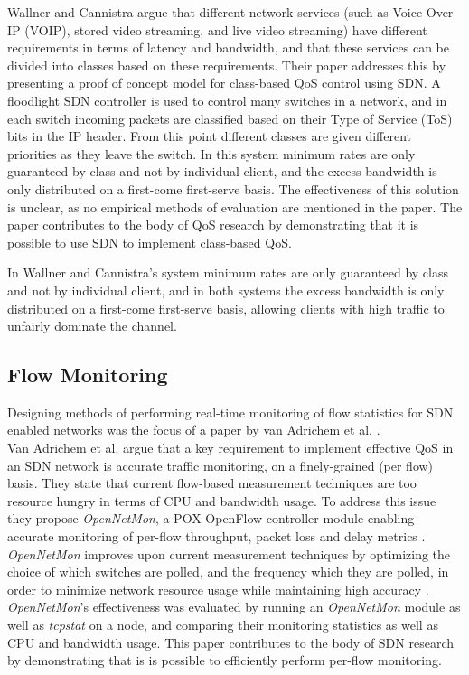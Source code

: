 \documentclass[accepted,single]{gipaper}
\begin{document}
Wallner and Cannistra \cite{Wallner:2013} argue that different network services (such as Voice Over IP (VOIP), stored video streaming, and live video streaming) have different requirements in terms of latency and bandwidth, and that these services can be divided into classes based on these requirements. Their paper addresses this by presenting a proof of concept model for class-based QoS control using SDN. A floodlight SDN controller is used to control many switches in a network, and in each switch incoming packets are classified based on their Type of Service (ToS) bits in the IP header. From this point different classes are given different priorities as they leave the switch. In this system minimum rates are only guaranteed by class and not by individual client, and the excess bandwidth is only distributed on a first-come first-serve basis. The effectiveness of this solution is unclear, as no empirical methods of evaluation are mentioned in the paper. The paper contributes to the body of QoS research by demonstrating that it is possible to use SDN to implement class-based QoS.


In Wallner and Cannistra's \cite{Wallner:2013} system minimum rates are only guaranteed by class and not by individual client, and in both systems the excess bandwidth is only distributed on a first-come first-serve basis, allowing clients with high traffic to unfairly dominate the channel.


\subsection{Flow Monitoring}
\label{flow_monitor}

Designing methods of performing real-time monitoring of flow statistics for SDN enabled networks was the focus of a paper by van Adrichem et al. \cite{vanAdrichem}.
\\


Van Adrichem et al. \cite{vanAdrichem} argue that a key requirement to implement effective QoS in an SDN network is accurate traffic monitoring, on a finely-grained (per flow) basis. They state that current flow-based measurement techniques are too resource hungry in terms of CPU and bandwidth usage. To address this issue they propose \textit{OpenNetMon}, a POX OpenFlow controller module enabling accurate monitoring of per-flow throughput, packet loss and delay metrics \cite{vanAdrichem}. \textit{OpenNetMon} improves upon current measurement techniques by optimizing the choice of which switches are polled, and the frequency which they are polled, in order to minimize network resource usage while maintaining high accuracy \cite{vanAdrichem}. \textit{OpenNetMon}'s effectiveness was evaluated by running an \textit{OpenNetMon} module as well as \textit{tcpstat} on a node, and comparing their monitoring statistics as well as CPU and bandwidth usage. This paper contributes to the body of SDN research by demonstrating that is is possible to efficiently perform per-flow monitoring.
\end{document}
